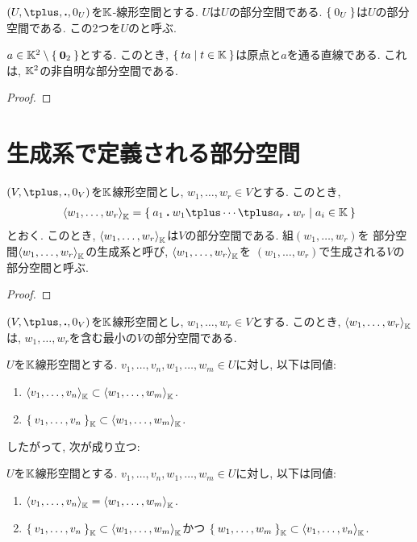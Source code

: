 \begin{example}
  $(U,\plus ,\act,0_U)$を$\mathbb{K}$-線形空間とする.
  $U$は$U$の部分空間である.
  $\Set{0_U}$は$U$の部分空間である.
  この2つを$U$のと呼ぶ.
\end{example}

\begin{example}
  $a\in \mathbb{K}^2\setminus\Set{\boldsymbol{0}_2}$とする.
  このとき, $\Set{ta|t\in \mathbb{K}}$は原点と$a$を通る直線である.
  これは, $\mathbb{K}^2$の非自明な部分空間である.
\end{example}
\begin{proof}\end{proof}


\section{生成系で定義される部分空間}

\begin{example}
  $(V,\plus,\act,0_V)$を$\mathbb{K}$線形空間とし,
  $w_1,\ldots,w_r\in V$とする.
  このとき,
  \begin{align*}
  \Braket{w_1,\ldots,w_r}_{\KK}=\Set{a_1\act w_1\plus\cdots \plus a_r\act w_r|a_i\in\KK}
  \end{align*}
  とおく.
  このとき,
  $\Braket{w_1,\ldots,w_r}_{\mathbb{K}}$は$V$の部分空間である.
組$(w_1,\ldots,w_r)$を
部分空間$\Braket{w_1,\ldots,w_r}_{\mathbb{K}}$の生成系と呼び,
$\Braket{w_1,\ldots,w_r}_{\mathbb{K}}$を
$(w_1,\ldots,w_r)$で生成される$V$の部分空間と呼ぶ.
\end{example}
\begin{proof}\end{proof}



\begin{prop}
  $(V,\plus,\act,0_V)$を$\mathbb{K}$線形空間とし,
  $w_1,\ldots,w_r\in V$とする.
  このとき,
  $\Braket{w_1,\ldots,w_r}_{\mathbb{K}}$
  は,
  $w_1,\ldots,w_r$を含む最小の$V$の部分空間である.
\end{prop}

\begin{lemma}
  \label{lem:gen:inclusion}
  $U$を$\mathbb{K}$線形空間とする.
  $v_1,\ldots,v_n,w_1,\ldots,w_m\in U$に対し,
  以下は同値:
  \begin{enumerate}
  \item $\Braket{v_1,\ldots,v_n}_{\mathbb{K}}\subset\Braket{w_1,\ldots,w_m}_{\mathbb{K}}$.
  \item $\Set{v_1,\ldots,v_n}_{\mathbb{K}}\subset\Braket{w_1,\ldots,w_m}_{\mathbb{K}}$.
  \end{enumerate}
\end{lemma}
したがって,
次が成り立つ:
\begin{lemma}
  $U$を$\mathbb{K}$線形空間とする.
  $v_1,\ldots,v_n,w_1,\ldots,w_m\in U$に対し,
  以下は同値:
  \begin{enumerate}
  \item $\Braket{v_1,\ldots,v_n}_{\mathbb{K}}=\Braket{w_1,\ldots,w_m}_{\mathbb{K}}$.
  \item $\Set{v_1,\ldots,v_n}_{\mathbb{K}}\subset\Braket{w_1,\ldots,w_m}_{\mathbb{K}}$かつ
    $\Set{w_1,\ldots,w_m}_{\mathbb{K}}\subset\Braket{v_1,\ldots,v_n}_{\mathbb{K}}$.
  \end{enumerate}
\end{lemma}


